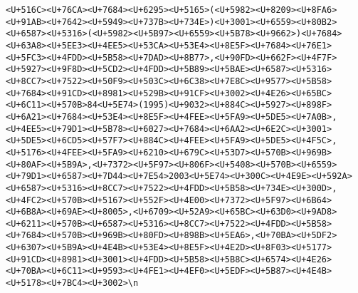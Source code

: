 \documentclass[
]{article}
\begin{document}
\begin{verbatim}
<U+516C><U+76CA><U+7684><U+6295><U+5165>(<U+5982><U+8209><U+8FA6><U+91AB><U+7642><U+5949><U+737B><U+734E>)<U+3001><U+6559><U+80B2><U+6587><U+5316>(<U+5982><U+5B97><U+6559><U+5B78><U+9662>)<U+7684><U+63A8><U+5EE3><U+4EE5><U+53CA><U+53E4><U+8E5F><U+7684><U+76E1><U+5FC3><U+4FDD><U+5B58><U+7DAD><U+8B77>,<U+90FD><U+662F><U+4F7F><U+5927><U+9F8D><U+5CD2><U+4FDD><U+5B89><U+5BAE><U+6587><U+5316><U+8CC7><U+7522><U+50F9><U+503C><U+6C38><U+7E8C><U+9577><U+5B58><U+7684><U+91CD><U+8981><U+529B><U+91CF><U+3002><U+4E26><U+65BC><U+6C11><U+570B>84<U+5E74>(1995)<U+9032><U+884C><U+5927><U+898F><U+6A21><U+7684><U+53E4><U+8E5F><U+4FEE><U+5FA9><U+5DE5><U+7A0B>,<U+4EE5><U+79D1><U+5B78><U+6027><U+7684><U+6AA2><U+6E2C><U+3001><U+5DE5><U+6CD5><U+57F7><U+884C><U+4FEE><U+5FA9><U+5DE5><U+4F5C>,<U+5176><U+4FEE><U+5FA9><U+6210><U+679C><U+53D7><U+570B><U+969B><U+80AF><U+5B9A>,<U+7372><U+5F97><U+806F><U+5408><U+570B><U+6559><U+79D1><U+6587><U+7D44><U+7E54>2003<U+5E74><U+300C><U+4E9E><U+592A><U+6587><U+5316><U+8CC7><U+7522><U+4FDD><U+5B58><U+734E><U+300D>,<U+4FC2><U+570B><U+5167><U+552F><U+4E00><U+7372><U+5F97><U+6B64><U+6B8A><U+69AE><U+8005>,<U+6709><U+52A9><U+65BC><U+63D0><U+9AD8><U+6211><U+570B><U+6587><U+5316><U+8CC7><U+7522><U+4FDD><U+5B58><U+7684><U+570B><U+969B><U+80FD><U+898B><U+5EA6>,<U+70BA><U+5DF2><U+6307><U+5B9A><U+4E4B><U+53E4><U+8E5F><U+4E2D><U+8F03><U+5177><U+91CD><U+8981><U+3001><U+4FDD><U+5B58><U+5B8C><U+6574><U+4E26><U+70BA><U+6C11><U+9593><U+4FE1><U+4EF0><U+5EDF><U+5B87><U+4E4B><U+5178><U+7BC4><U+3002>\n

\end{verbatim}
\end{document}
